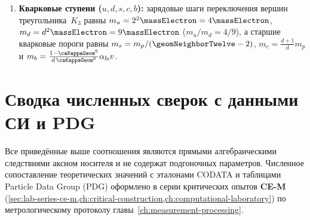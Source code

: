 \begin{proposition}
\begin{enumerate}[leftmargin=*]
  одетый кластер из $N_\varphi = 1 + \geomNeighborTwelve = 13$ ячеек определяет массу электрона
  \[
    \massElectron = \frac{\alpha_{\mathrm{fs}}^2\,m_H}{N_\varphi} \approx 0{,}5133\ \mathrm{МэВ},
  \]
  а три пространственных стека поколений ($g\in\{0,1,2\}$, $N_{\mathrm{gen}}=d=3$) с амплитудой кубооктаэдра~$\caKappaGeom^{-1}$
  и начальным фазовым сдвигом двухкомпонентного спинора на битовом регистре ячейки $\delta_0 = 2/\lfloor\caBitBudget\rfloor = 2/9$
  дают формулу масс поколений:
  \begin{align*}
    \sqrt{m_g} &\propto 1 + \frac{1}{\caKappaGeom}\cos\!\left(\frac{2\pi g}{d} + \frac{2}{\lfloor\caBitBudget\rfloor}\right),\\
    \frac{m_\mu}{\massElectron} &\approx 206{,}7703\ \ (\text{PDG: }206{,}7683),\qquad
    \frac{m_\tau}{\massElectron} \approx 3477{,}47\ \ (\text{PDG: }3477{,}23\pm 0{,}23).
  \end{align*}
  Индекс $g$ не закреплён жёстко за поколением: каноническое присвоение $(e,\mu,\tau)$ --- по возрастанию амплитуды ($m_e$ --- наименьшая из трёх амплитуд, $m_\mu$ --- средняя, $m_\tau$ --- наибольшая; каноническая реализация --- \texttt{mt\_ca/si\_sm\_rows.py}, \texttt{lep\_w = sorted(...)}).
\item \textbf{Кварковые ступени ($u,d,s,c,b$):}
  зарядовые шаги переключения вершин треугольника~$K_3$ равны $m_u = 2^2\massElectron = 4\massElectron$, $m_d = d^2\massElectron = 9\massElectron$ ($m_u/m_d = 4/9$),
  а старшие кварковые пороги равны $m_s = m_p/(\geomNeighborTwelve-2)$, $m_c = \frac{d+1}{d}m_p$ и $m_b = \frac{1-\caKappaGeom^6}{d\,\caKappaGeom^6}\alpha_{\mathrm{fs}}v$.
\end{enumerate}
\end{proposition}

\section{Сводка численных сверок с данными СИ и PDG}
\label{sec:si-pdg-experiments-journal}

Все приведённые выше соотношения являются прямыми алгебраическими следствиями аксиом носителя и не содержат подгоночных параметров.
Численное сопоставление теоретических значений с эталонами CODATA и таблицами Particle Data Group (PDG)
оформлено в серии критических опытов \textbf{CE-M} (\cref{sec:lab-series-ce-m,ch:critical-construction,ch:computational-laboratory})
по метрологическому протоколу главы~\ref{ch:measurement-processing}.



